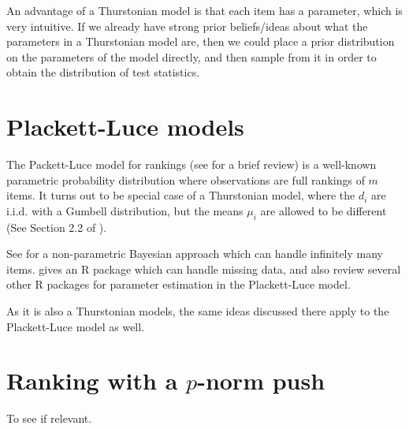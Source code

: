 \documentclass[10pt]{article}
\begin{document}
An advantage of a Thurstonian model is that each item has a parameter, which is very intuitive. If we already have strong prior beliefs/ideas about what the parameters in a Thurstonian model are, then we could place a prior distribution on the parameters of the model directly, and then sample from it in order to obtain the distribution of test statistics.


\section{Plackett-Luce models}
\label{sec:pl}
The Packett-Luce model for rankings (see \cite{maystre2015fast} for a brief review) is a well-known parametric probability distribution where observations are full rankings of $m$ items. It turns out to be special case of a Thurstonian model, where the $d_i$ are i.i.d. with a Gumbell distribution, but the means $\mu_i$ are allowed to be different (See Section 2.2 of \cite{guiver2009bayesian}).

See \cite{caron2014bayesian} for a non-parametric Bayesian approach which can handle infinitely many items. \cite{turner2020modelling} gives an R package which can handle missing data, and also review several other R packages for parameter estimation in the Plackett-Luce model.

As it is also a Thurstonian models, the same ideas discussed there apply to the Plackett-Luce model as well.
\section{Ranking with a $p$-norm push}
\label{sec:push}
To see if relevant.

\appendix




    
\end{document}
